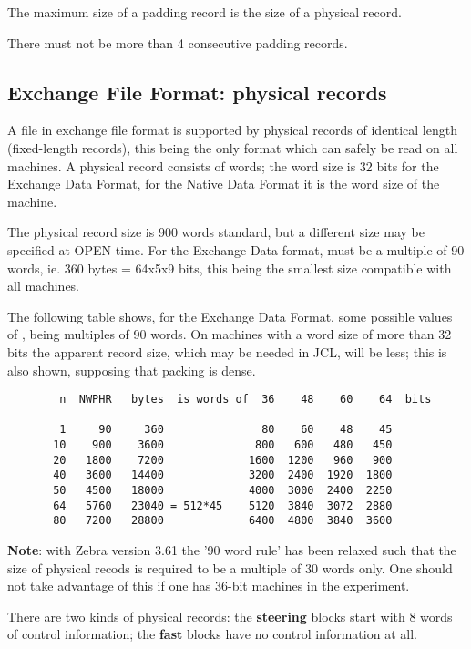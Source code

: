 The maximum size of a padding record is the size of a
physical record.

There must not be more than 4 consecutive padding records.

\subsection*{Exchange File Format: physical records}

A file in exchange file format is supported by physical records of
identical length (fixed-length records), this being the only
format which can safely be read on all machines.
A physical record consists of  words;
the word size is 32 bits for the Exchange Data Format,
for the Native Data Format it is the word size of the machine.

The physical record size  is 900 words standard,
but a different size may be specified at OPEN time.
For the Exchange Data format,  must be a multiple of 90 words,
ie. 360 bytes = 64x5x9 bits,
this being the smallest size compatible with all machines.

The following table shows, for the Exchange Data Format,
some possible values of , being multiples of 90 words.
On machines with a word size of more than 32 bits the apparent
record size, which may be needed in JCL, will be less;
this is also shown, supposing that packing is dense.

\begin{verbatim}
        n  NWPHR   bytes  is words of  36    48    60    64  bits

        1     90     360               80    60    48    45
       10    900    3600              800   600   480   450
       20   1800    7200             1600  1200   960   900
       40   3600   14400             3200  2400  1920  1800
       50   4500   18000             4000  3000  2400  2250
       64   5760   23040 = 512*45    5120  3840  3072  2880
       80   7200   28800             6400  4800  3840  3600
\end{verbatim}

{\bf Note}: with Zebra version 3.61
the '90 word rule' has been relaxed such that the size of
physical recods is required to be a multiple of 30 words only.
One should not take advantage of this if one has 36-bit machines
in the experiment.

There are two kinds of physical records:
the {\bf steering} blocks start with 8 words of control information;
the {\bf fast} blocks have no control information at all.


